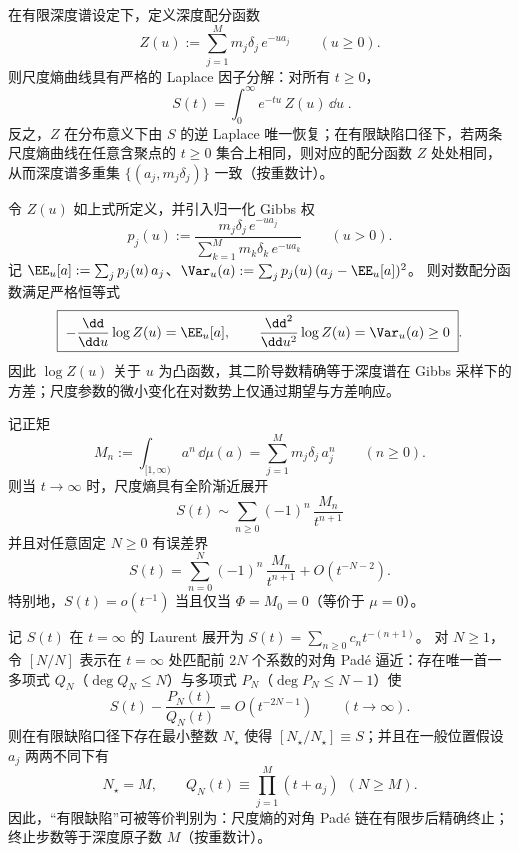 \begin{proposition}
在有限深度谱设定下，定义深度配分函数
\[
Z(u):=\sum_{j=1}^{M} m_j\delta_j\,e^{-u a_j}
\qquad (u\ge 0).
\]
则尺度熵曲线具有严格的 Laplace 因子分解：对所有 \(t\ge 0\)，
\[
\boxed{\;
S(t)=\int_{0}^{\infty}e^{-t u}\,Z(u)\,\dd u\; }.
\]
反之，\(Z\) 在分布意义下由 \(S\) 的逆 Laplace 唯一恢复；在有限缺陷口径下，若两条尺度熵曲线在任意含聚点的 \(t\ge 0\) 集合上相同，则对应的配分函数 \(Z\) 处处相同，从而深度谱多重集 \(\{(a_j,m_j\delta_j)\}\) 一致（按重数计）。
\end{proposition}

\begin{proposition}
令 \(Z(u)\) 如上式所定义，并引入归一化 Gibbs 权
\[
p_j(u):=\frac{m_j\delta_j\,e^{-u a_j}}{\sum_{k=1}^{M}m_k\delta_k\,e^{-u a_k}}
\qquad (u>0).
\]
记 \(\EE_u[a]:=\sum_j p_j(u)\,a_j\)、\(\Var_u(a):=\sum_j p_j(u)\,(a_j-\EE_u[a])^2\)。
则对数配分函数满足严格恒等式
\[
\boxed{\;
-\frac{\dd}{\dd u}\log Z(u)=\EE_u[a],\qquad
\frac{\dd^2}{\dd u^2}\log Z(u)=\Var_u(a)\ge 0\; }.
\]
因此 \(\log Z(u)\) 关于 \(u\) 为凸函数，其二阶导数精确等于深度谱在 Gibbs 采样下的方差；尺度参数的微小变化在对数势上仅通过期望与方差响应。
\end{proposition}

\begin{proposition}
记正矩
\[
M_n:=\int_{[1,\infty)}a^{n}\,\dd\mu(a)=\sum_{j=1}^{M}m_j\delta_j\,a_j^{n}
\qquad (n\ge 0).
\]
则当 \(t\to\infty\) 时，尺度熵具有全阶渐近展开
\[
\boxed{\;
S(t)\sim \sum_{n\ge0}(-1)^n\,\frac{M_n}{t^{n+1}}\;}
\]
并且对任意固定 \(N\ge 0\) 有误差界
\[
S(t)=\sum_{n=0}^{N}(-1)^n\,\frac{M_n}{t^{n+1}}+O(t^{-N-2}).
\]
特别地，\(S(t)=o(t^{-1})\) 当且仅当 \(\Phi=M_0=0\)（等价于 \(\mu=0\)）。
\end{proposition}

\begin{proposition}
记 \(S(t)\) 在 \(t=\infty\) 的 Laurent 展开为 \(S(t)=\sum_{n\ge0}c_n t^{-(n+1)}\)。
对 \(N\ge 1\)，令 \([N/N]\) 表示在 \(t=\infty\) 处匹配前 \(2N\) 个系数的对角 Pad\'e 逼近：存在唯一首一多项式 \(Q_N\)（\(\deg Q_N\le N\)）与多项式 \(P_N\)（\(\deg P_N\le N-1\)）使
\[
S(t)-\frac{P_N(t)}{Q_N(t)}=O(t^{-2N-1})\qquad (t\to\infty).
\]
则在有限缺陷口径下存在最小整数 \(N_\star\) 使得 \([N_\star/N_\star]\equiv S\)；并且在一般位置假设 \(a_j\) 两两不同下有
\[
\boxed{\;N_\star=M,\qquad Q_N(t)\equiv \prod_{j=1}^{M}(t+a_j)\ \ (N\ge M).\;}
\]
因此，“有限缺陷”可被等价判别为：尺度熵的对角 Pad\'e 链在有限步后精确终止；终止步数等于深度原子数 \(M\)（按重数计）。
\end{proposition}

